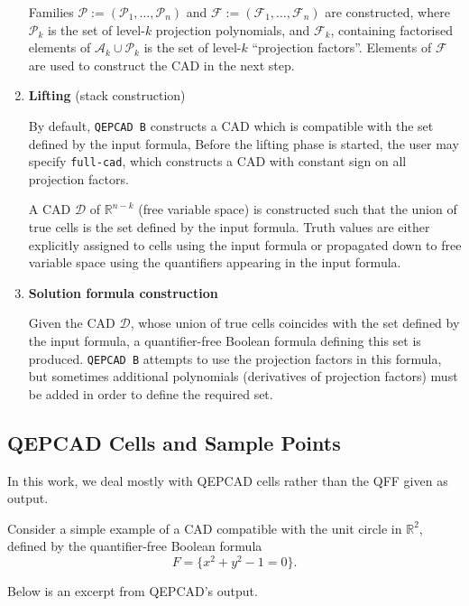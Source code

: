 \documentclass[
]{book}
\theoremstyle{definition}
\theoremstyle{definition}
\theoremstyle{definition}
\theoremstyle{definition}
\theoremstyle{remark}
\begin{document}
\begin{enumerate}
  Families \(\mathcal{P} := (\mathcal{P}_1,\ldots,\mathcal{P}_n)\) and \(\mathcal{F} := (\mathcal{F}_1,\ldots,\mathcal{F}_n)\) are constructed, where \(\mathcal{P}_k\) is the set of level-\(k\) projection polynomials, and \(\mathcal{F}_k\), containing factorised elements of \(\mathcal{A}_k \cup \mathcal{P}_k\) is the set of level-\(k\) ``projection factors''. Elements of \(\mathcal{F}\) are used to construct the CAD in the next step.
\item
  \textbf{Lifting} (stack construction)

  By default, \texttt{QEPCAD\ B} constructs a CAD which is compatible with the set defined by the input formula,
  Before the lifting phase is started, the user may specify \texttt{full-cad}, which constructs a CAD with constant sign on all projection factors.

  A CAD \(\mathcal{D}\) of \(\mathbb{R}^{n-k}\) (free variable space) is constructed such that the union of true cells is the set defined by the input formula.
  Truth values are either explicitly assigned to cells using the input formula or propagated down to free variable space using the quantifiers appearing in the input formula.
\item
  \textbf{Solution formula construction}

  Given the CAD \(\mathcal{D}\), whose union of true cells coincides with the set defined by the input formula, a quantifier-free Boolean formula defining this set is produced. \texttt{QEPCAD\ B} attempts to use the projection factors in this formula, but sometimes additional polynomials (derivatives of projection factors) must be added in order to define the required set.
\end{enumerate}

\hypertarget{qepcad-cells-and-sample-points}{%
\subsection{QEPCAD Cells and Sample Points}\label{qepcad-cells-and-sample-points}}

In this work, we deal mostly with QEPCAD cells rather than the QFF given as output.

Consider a simple example of a CAD compatible with the unit circle in \(\mathbb{R}^2\), defined by the quantifier-free Boolean formula
\[
F = \{ x^2 + y^2 - 1 = 0 \}.
\]

Below is an excerpt from QEPCAD's output.
\end{document}
